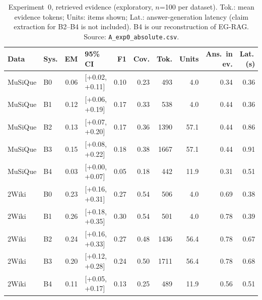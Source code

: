 \begin{table}[t]
\centering
\footnotesize
\begin{tabular}{@{}llrlrrrrrr@{}}
\toprule
Data & Sys. & EM & 95\% CI & F1 & Cov. & Tok. & Units & Ans.\ in ev. & Lat.\,(s) \\
\midrule
MuSiQue & B0 & 0.06 & [+0.02, +0.11] & 0.10 & 0.23 & 493 & 4.0 & 0.34 & 0.36 \\
MuSiQue & B1 & 0.12 & [+0.06, +0.19] & 0.17 & 0.33 & 538 & 4.0 & 0.44 & 0.36 \\
MuSiQue & B2 & 0.13 & [+0.07, +0.20] & 0.17 & 0.36 & 1390 & 57.1 & 0.44 & 0.86 \\
MuSiQue & B3 & 0.15 & [+0.08, +0.22] & 0.18 & 0.38 & 1667 & 57.1 & 0.44 & 0.91 \\
MuSiQue & B4 & 0.03 & [+0.00, +0.07] & 0.05 & 0.18 & 442 & 11.9 & 0.31 & 0.51 \\
\midrule
2Wiki & B0 & 0.23 & [+0.16, +0.31] & 0.27 & 0.54 & 506 & 4.0 & 0.69 & 0.38 \\
2Wiki & B1 & 0.26 & [+0.18, +0.35] & 0.30 & 0.54 & 501 & 4.0 & 0.78 & 0.39 \\
2Wiki & B2 & 0.24 & [+0.16, +0.33] & 0.27 & 0.48 & 1436 & 56.4 & 0.78 & 0.67 \\
2Wiki & B3 & 0.20 & [+0.12, +0.28] & 0.24 & 0.50 & 1711 & 56.4 & 0.78 & 0.68 \\
2Wiki & B4 & 0.11 & [+0.05, +0.17] & 0.13 & 0.25 & 489 & 11.9 & 0.56 & 0.51 \\
\bottomrule
\end{tabular}
\caption{Experiment~0, retrieved evidence (exploratory, $n$=100 per dataset). Tok.: mean evidence tokens; Units: items shown; Lat.: answer-generation latency (claim extraction for B2--B4 is not included). B4 is our reconstruction of EG-RAG. Source: \texttt{A\_exp0\_absolute.csv}.}
\label{tab:exp0}
\end{table}

